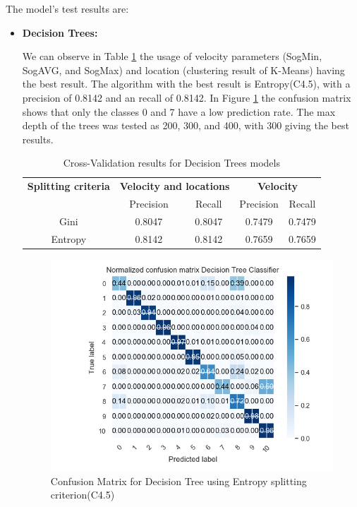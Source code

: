 The model's test results are:

\begin{itemize}
\item \textbf{ Decision Trees: }

We can observe in Table \ref{table:cross_val_dt} the usage of velocity parameters (SogMin, SogAVG, and SogMax) and location (clustering result of K-Means) having the best result. The algorithm with the best result is Entropy(C4.5), with a precision of 0.8142 and an recall of 0.8142. In Figure \ref{table:cross_val_dt} the confusion matrix shows that only the classes 0 and 7 have a low prediction rate. The max depth of the trees was tested as 200, 300, and 400, with 300 giving the best results.


\begin {table}[H]
\caption {Cross-Validation results for Decision Trees models}
\begin{center}
\begin{tabular}{c|c|c|c|c}
\multicolumn{1}{c|}{\textbf{Splitting criteria } } &\multicolumn{2}{c|}{\textbf{ Velocity and locations}}& \multicolumn{2}{c}{\textbf{ Velocity}}\\
&Precision & Recall & Precision & Recall \\
\hline
Gini & 0.8047& 0.8047&0.7479&0.7479\\
Entropy& 0.8142& 0.8142&0.7659&0.7659
\label{table:cross_val_dt}
\end{tabular}
\end{center}
\end {table}

\begin{figure}[H]
\centering
\includegraphics[width=0.8\linewidth]{Chapters/img/CM_DT.png}
\caption{Confusion Matrix for Decision Tree using Entropy splitting criterion(C4.5)}
\label{fig:cm_dt}
\end{figure}



\end{itemize}
